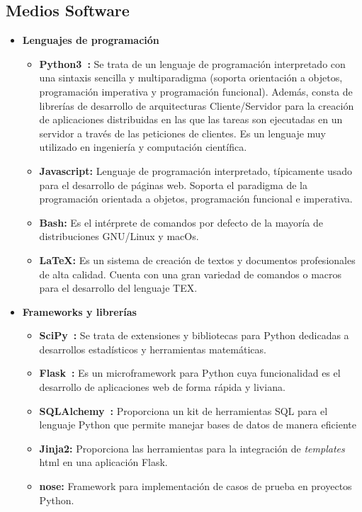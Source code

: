 \subsection{Medios Software}
\begin{itemize}
\item \textbf{Lenguajes de programación}
  \begin{itemize}
  \item \textbf{Python3~\cite{Goer04}:} Se trata de un lenguaje de programación interpretado con una sintaxis sencilla y multiparadigma (soporta orientación a objetos, programación imperativa y programación funcional). Además, consta de librerías de desarrollo de arquitecturas Cliente/Servidor para la creación de aplicaciones distribuidas en las que las tareas son ejecutadas en un servidor a través de las peticiones de clientes. Es un lenguaje muy utilizado en ingeniería y computación científica.
  \item \textbf{Javascript:} Lenguaje de programación interpretado, típicamente usado para el desarrollo de páginas web. Soporta el paradigma de la programación orientada a objetos, programación funcional e imperativa.
  \item \textbf{Bash:} Es el intérprete de comandos por defecto de la mayoría de distribuciones GNU/Linux y macOs.
  \item \textbf{\LaTeX{}:} Es un sistema de creación de textos y documentos profesionales de alta calidad. Cuenta con una gran variedad de comandos o macros para el desarrollo del lenguaje TEX.
  \end{itemize}
\item \textbf{Frameworks y librerías}
  \begin{itemize}
  \item \textbf{SciPy~\cite{Scip}:} Se trata de extensiones y bibliotecas para Python dedicadas a desarrollos estadísticos y herramientas matemáticas.
  \item \textbf{Flask~\cite{Flask}:} Es un microframework para Python cuya funcionalidad es el desarrollo de aplicaciones web de forma rápida y liviana.
  \item \textbf{SQLAlchemy~\cite{SqlAl}:} Proporciona un kit de herramientas SQL para el lenguaje Python que permite manejar bases de datos de manera eficiente
  \item \textbf{Jinja2:} Proporciona las herramientas para la integración de \textit{templates} html en una aplicación Flask.
  \item \textbf{nose:} Framework para implementación de casos de prueba en proyectos Python.

\end{itemize}
\end{itemize}
